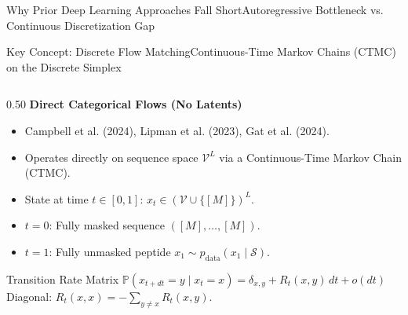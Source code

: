 \documentclass[aspectratio=169, 10pt]{beamer}
\begin{document}
\begin{frame}{Why Prior Deep Learning Approaches Fall Short}{Autoregressive Bottleneck vs. Continuous Discretization Gap}
\vspace{0.15cm}
\end{frame}

\begin{frame}{Key Concept: Discrete Flow Matching}{Continuous-Time Markov Chains (CTMC) on the Discrete Simplex}
\begin{columns}[T]
\begin{column}{0.50\textwidth}
  \textbf{\footnotesize Direct Categorical Flows (No Latents)}
  \begin{itemize}\setlength{\itemsep}{2pt}\scriptsize
    \item Campbell et al. (2024), Lipman et al. (2023), Gat et al. (2024).
    \item Operates directly on sequence space $\mathcal{V}^L$ via a Continuous-Time Markov Chain (CTMC).
    \item State at time $t \in [0, 1]$: $x_t \in (\mathcal{V} \cup \{[M]\})^L$.
    \item $t=0$: Fully masked sequence $([M], \dots, [M])$.
    \item $t=1$: Fully unmasked peptide $x_1 \sim p_{\text{data}}(x_1 \mid \mathcal{S})$.
  \end{itemize}
  \vspace{0.05cm}
  \begin{block}{\scriptsize Transition Rate Matrix}
    \scriptsize
    $\mathbb{P}(x_{t+dt} = y \mid x_t = x) = \delta_{x, y} + R_t(x, y) \, dt + o(dt)$\\
    Diagonal: $R_t(x, x) = -\sum_{y \ne x} R_t(x, y)$.
  \end{block}
\end{column}


\end{columns}
\end{frame}
\end{document}
